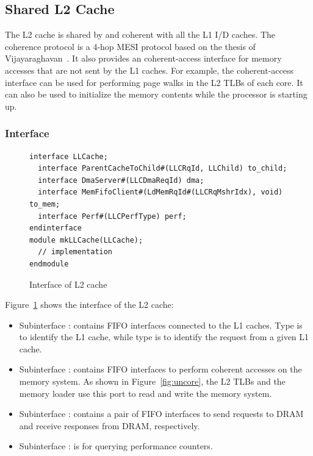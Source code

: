 \subsection{Shared L2 Cache}
The L2 cache is shared by and coherent with all the L1 I/D caches.
The coherence protocol is a 4-hop MESI protocol based on the thesis of Vijayaraghavan~\cite{murali}.
It also provides an coherent-access interface for memory accesses that are not sent by the L1 caches.
For example, the coherent-access interface can be used for performing page walks in the L2 TLBs of each core.
It can also be used to initialize the memory contents while the processor is starting up.

\subsubsection{Interface}

\begin{figure}
\begin{lstlisting}[caption={}]
interface LLCache;
  interface ParentCacheToChild#(LLCRqId, LLChild) to_child;
  interface DmaServer#(LLCDmaReqId) dma;
  interface MemFifoClient#(LdMemRqId#(LLCRqMshrIdx), void) to_mem;
  interface Perf#(LLCPerfType) perf;
endinterface
module mkLLCache(LLCache);
  // implementation
endmodule
\end{lstlisting}
\caption{Interface of L2 cache}\label{fig:l2-cache-ifc}
\end{figure}

Figure~\ref{fig:l2-cache-ifc} shows the interface of the L2 cache:
\begin{itemize}
    \item Subinterface : contains FIFO interfaces connected to the L1 caches.
    Type  is to identify the L1 cache, while type  is to identify the request from a given L1 cache.
    \item Subinterface : contains FIFO interfaces to perform coherent accesses on the memory system.
    As shown in Figure~\ref{fig:uncore}, the L2 TLBs and the memory loader use this port to read and write the memory system.
    \item Subinterface : contains a pair of FIFO interfaces to send requests to DRAM and receive responses from DRAM, respectively.
    \item Subinterface : is for querying performance counters. 
\end{itemize}


